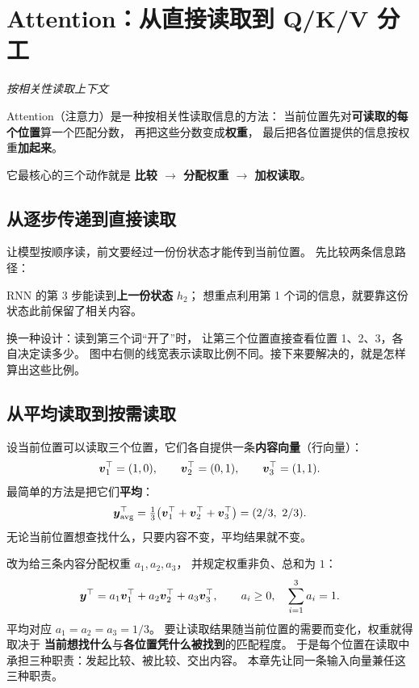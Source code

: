 \chapterrule
\section{Attention：从直接读取到 Q/K/V 分工}
\label{intro:attention-qkv}
\label{intro:why-attention}
\label{concept:attention}

\begin{idea}
\noindent\emph{按相关性读取上下文}\par

Attention（注意力）是一种按相关性读取信息的方法：
当前位置先对\textbf{可读取的每个位置}算一个匹配分数，
再把这些分数变成\textbf{权重}，
最后把各位置提供的信息按权重\textbf{加起来}。

它最核心的三个动作就是
\textbf{比较 $\to$ 分配权重 $\to$ 加权读取}。
\end{idea}

\subsection{从逐步传递到直接读取}

 让模型按顺序读，前文要经过一份份状态才能传到当前位置。
先比较两条信息路径：

RNN 的第 3 步能读到\textbf{上一份状态} $h_2$；
想重点利用第 1 个词的信息，就要靠这份状态此前保留了相关内容。

换一种设计：读到第三个词“开了”时，
让第三个位置直接查看位置 1、2、3，各自决定读多少。
图中右侧的线宽表示读取比例不同。接下来要解决的，就是怎样算出这些比例。

\subsection{从平均读取到按需读取}

设当前位置可以读取三个位置，它们各自提供一条\textbf{内容向量}（行向量）：
\[
\boldsymbol{v}_1^\top=(1,0),\qquad
\boldsymbol{v}_2^\top=(0,1),\qquad
\boldsymbol{v}_3^\top=(1,1).
\]
最简单的方法是把它们\textbf{平均}：
\[
\boldsymbol{y}_{\rm avg}^\top
=\tfrac13\bigl(\boldsymbol{v}_1^\top+\boldsymbol{v}_2^\top+\boldsymbol{v}_3^\top\bigr)
=(2/3,\ 2/3).
\]
无论当前位置想查找什么，只要内容不变，平均结果就不变。

改为给三条内容分配权重 $a_1,a_2,a_3$，
并规定权重非负、总和为 $1$：
\begin{equation}
\boldsymbol{y}^\top=a_1\boldsymbol{v}_1^\top+a_2\boldsymbol{v}_2^\top+a_3\boldsymbol{v}_3^\top,\qquad
a_i\ge0,\quad \sum_{i=1}^3 a_i=1.
\label{eq:attention-design-goal}
\end{equation}
平均对应 $a_1=a_2=a_3=1/3$。
要让读取结果随当前位置的需要而变化，权重就得取决于
\textbf{当前想找什么}与\textbf{各位置凭什么被找到}的匹配程度。
于是每个位置在读取中承担三种职责：发起比较、被比较、交出内容。
本章先让同一条输入向量兼任这三种职责。

